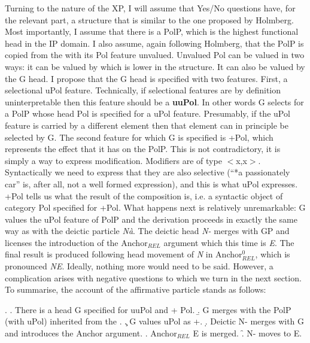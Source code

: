 \documentclass[output=paper]{LSP/langsci}
\begin{document}
Turning to the nature of the XP, I will assume that  Yes/No questions have, for the relevant part, a structure that is similar to the one proposed by Holmberg.  Most importantly, I assume that there is a PolP, which is the highest functional head in the IP domain.  I also assume, again following Holmberg, that the PolP is copied from the  with its Pol feature unvalued.  Unvalued Pol can be valued in two ways:  it can be valued by  which is lower in the structure.  It can also be valued by the G head.    
I propose that the G head is specified with two features.  First, a selectional uPol feature. Technically, if selectional features are by definition uninterpretable then this feature should be a \textbf{uuPol}.  In other words  G selects for a PolP whose head Pol is specified for a uPol feature.  Presumably, if the uPol feature is carried by a different element then that element can in principle be selected by G.  The second feature for which G is specified is +Pol, which represents the effect that it has on the PolP.  
This is not contradictory, it is simply a way to express modification.  Modifiers are of type $<$x,x$>$. Syntactically we need to express that they are also selective (``*a passionately car'' is, after all, not a well formed expression), and this is what uPol expresses.  +Pol tells us what the result of the composition is, i.e. a syntactic object of category Pol specified for +Pol.  What happens next is relatively unremarkable:  G values the uPol feature of PolP and the derivation proceeds in exactly the same way as with the deictic particle \textit{N\`{a}}.  The deictic head \textit{N-} merges with GP and licenses the introduction of the Anchor$_{REL}$ argument which this time is \textit{E}.  The final result is produced following head movement of \textit{N} in  Anchor$_{REL}^0$, which is pronounced \textit{NE}.  Ideally, nothing more would need to be said.  However, a complication arises with negative questions to which we turn in the next section.  To summarise, the account of the affirmative particle \nai stands as follows:

\Lsciex.
\a. There is a head G specified for uuPol and + Pol.
\b. G merges with the PolP (with uPol) inherited from the .
\c. G values uPol as +.
\d.  Deictic N- merges with G and introduces the Anchor argument.
\e.  Anchor$_{REL}$ E is merged.
\f.  N- moves to E.
\end{document}
